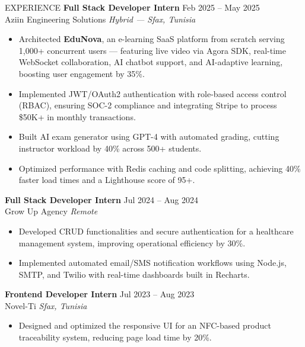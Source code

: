 \documentclass{resume}
\begin{document}
\begin{rSection}{EXPERIENCE}
\textbf{Full Stack Developer Intern} \hfill Feb 2025 -- May 2025 \\
Aziin Engineering Solutions \hfill \textit{Hybrid — Sfax, Tunisia}
\begin{itemize}
    \itemsep -3pt {}
    \item Architected \textbf{EduNova}, an e-learning SaaS platform from scratch serving 1,000+ concurrent users — featuring live video via Agora SDK, real-time WebSocket collaboration, AI chatbot support, and AI-adaptive learning, boosting user engagement by 35\%.
    \item Implemented JWT/OAuth2 authentication with role-based access control (RBAC), ensuring SOC-2 compliance and integrating Stripe to process \$50K+ in monthly transactions.
    \item Built AI exam generator using GPT-4 with automated grading, cutting instructor workload by 40\% across 500+ students.
    \item Optimized performance with Redis caching and code splitting, achieving 40\% faster load times and a Lighthouse score of 95+.
\end{itemize}

\textbf{Full Stack Developer Intern} \hfill Jul 2024 -- Aug 2024 \\
Grow Up Agency \hfill \textit{Remote}
\begin{itemize}
    \itemsep -3pt {}
    \item Developed CRUD functionalities and secure authentication for a healthcare management system, improving operational efficiency by 30\%.
    \item Implemented automated email/SMS notification workflows using Node.js, SMTP, and Twilio with real-time dashboards built in Recharts.
\end{itemize}

\textbf{Frontend Developer Intern} \hfill Jul 2023 -- Aug 2023 \\
Novel-Ti \hfill \textit{Sfax, Tunisia}
\begin{itemize}
    \itemsep -3pt {}
    \item Designed and optimized the responsive UI for an NFC-based product traceability system, reducing page load time by 20\%.
\end{itemize}

\end{rSection}

\end{document}
